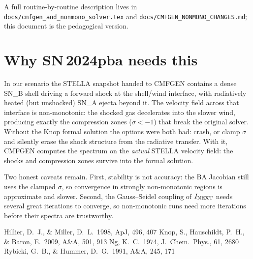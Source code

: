\documentclass[11pt,a4paper]{article}
\newcommand{\code}[1]{\texttt{#1}}
\begin{document}
A full routine-by-routine description lives in
\code{docs/cmfgen\_and\_nonmono\_solver.tex} and
\code{docs/CMFGEN\_NONMONO\_CHANGES.md}; this document is the
pedagogical version.

\section{Why SN\,2024pba needs this}
\label{sec:sn2024pba}

In our scenario the STELLA snapshot handed to CMFGEN contains a dense
SN\_B shell driving a forward shock at the shell/wind interface, with
radiatively heated (but unshocked) SN\_A ejecta beyond it.  The velocity
field across that interface is non-monotonic: the shocked gas
decelerates into the slower wind, producing exactly the compression
zones ($\sigma<-1$) that break the original solver.  Without the Knop
formal solution the options were both bad: crash, or clamp $\sigma$ and
silently erase the shock structure from the radiative transfer.  With
it, CMFGEN computes the spectrum on the \emph{actual} STELLA velocity
field: the shocks and compression zones survive into the formal
solution.

Two honest caveats remain.  First, stability is not accuracy: the BA
Jacobian still uses the clamped $\sigma$, so convergence in strongly
non-monotonic regions is approximate and slower.  Second, the
Gauss--Seidel coupling of $I_{\rm NEXT}$ needs several great iterations
to converge, so non-monotonic runs need more iterations before their
spectra are trustworthy.

\begin{thebibliography}{}
  Hillier, D.~J., \& Miller, D.~L.\ 1998, ApJ, 496, 407
  Knop, S., Hauschildt, P.~H., \& Baron, E.\ 2009, A\&A, 501, 913
  Ng, K.~C.\ 1974, J.\ Chem.\ Phys., 61, 2680
  Rybicki, G.~B., \& Hummer, D.~G.\ 1991, A\&A, 245, 171
\end{thebibliography}
\end{document}
